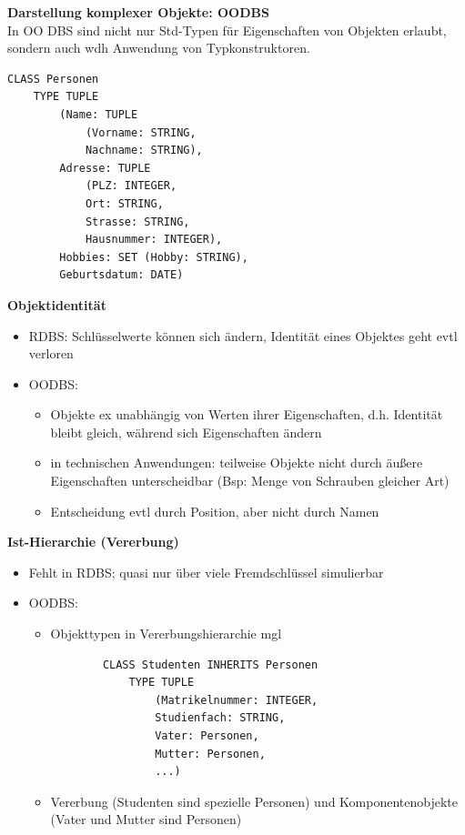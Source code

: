 \textbf{Darstellung komplexer Objekte: OODBS}\\
In OO DBS sind nicht nur Std-Typen für Eigenschaften von Objekten erlaubt, sondern auch wdh Anwendung von Typkonstruktoren.
\begin{lstlisting}
CLASS Personen
	TYPE TUPLE
		(Name: TUPLE
			(Vorname: STRING,
			Nachname: STRING),
		Adresse: TUPLE
			(PLZ: INTEGER,
			Ort: STRING,
			Strasse: STRING,
			Hausnummer: INTEGER),
		Hobbies: SET (Hobby: STRING),
		Geburtsdatum: DATE)
\end{lstlisting}

\textbf{Objektidentität}
\begin{itemize}
	\item RDBS: Schlüsselwerte können sich ändern, Identität eines Objektes geht evtl verloren
	\item OODBS: 
	\begin{itemize}
		\item Objekte ex unabhängig von Werten ihrer Eigenschaften, d.h. Identität bleibt gleich, während sich Eigenschaften ändern
		\item in technischen Anwendungen: teilweise Objekte nicht durch äußere Eigenschaften unterscheidbar (Bsp: Menge von Schrauben gleicher Art)
		\item Entscheidung evtl durch Position, aber nicht durch Namen
	\end{itemize}
\end{itemize}

\textbf{Ist-Hierarchie (Vererbung)}
\begin{itemize}
	\item Fehlt in RDBS; quasi nur über viele Fremdschlüssel simulierbar
	\item OODBS:
	\begin{itemize}
		\item Objekttypen in Vererbungshierarchie mgl
		\begin{lstlisting}
		CLASS Studenten INHERITS Personen
			TYPE TUPLE
				(Matrikelnummer: INTEGER,
				Studienfach: STRING,
				Vater: Personen,
				Mutter: Personen,
				...)
		\end{lstlisting}
		\item Vererbung (Studenten sind spezielle Personen) und Komponentenobjekte (Vater und Mutter sind Personen)
	\end{itemize}
\end{itemize}


